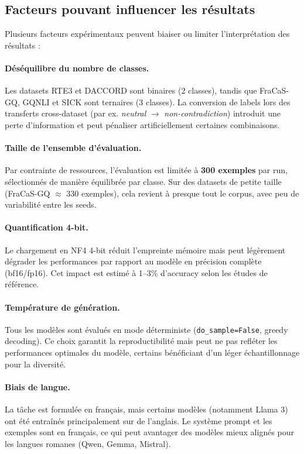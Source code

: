\subsection{Facteurs pouvant influencer les résultats}

Plusieurs facteurs expérimentaux peuvent biaiser ou limiter l'interprétation des résultats :

\paragraph{Déséquilibre du nombre de classes.}
Les datasets RTE3 et DACCORD sont binaires (2 classes), tandis que FraCaS-GQ, GQNLI et SICK sont ternaires (3 classes). La conversion de labels lors des transferts cross-dataset (par ex. \textit{neutral} $\to$ \textit{non-contradiction}) introduit une perte d'information et peut pénaliser artificiellement certaines combinaisons.

\paragraph{Taille de l'ensemble d'évaluation.}
Par contrainte de ressources, l'évaluation est limitée à \textbf{300 exemples} par run, sélectionnés de manière équilibrée par classe. Sur des datasets de petite taille (FraCaS-GQ $\approx$ 330 exemples), cela revient à presque tout le corpus, avec peu de variabilité entre les seeds.

\paragraph{Quantification 4-bit.}
Le chargement en NF4 4-bit réduit l'empreinte mémoire mais peut légèrement dégrader les performances par rapport au modèle en précision complète (bf16/fp16). Cet impact est estimé à 1--3\% d'accuracy selon les études de référence.

\paragraph{Température de génération.}
Tous les modèles sont évalués en mode déterministe (\texttt{do\_sample=False}, greedy decoding). Ce choix garantit la reproductibilité mais peut ne pas refléter les performances optimales du modèle, certains bénéficiant d'un léger échantillonnage pour la diversité.

\paragraph{Biais de langue.}
La tâche est formulée en français, mais certains modèles (notamment Llama 3) ont été entraînés principalement sur de l'anglais. Le système prompt et les exemples sont en français, ce qui peut avantager des modèles mieux alignés pour les langues romanes (Qwen, Gemma, Mistral).

